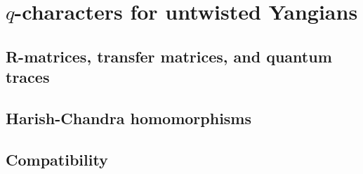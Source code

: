 \section{\texorpdfstring{$q$-characters for untwisted Yangians}{}}
    \subsection{R-matrices, transfer matrices, and quantum traces}

    \subsection{Harish-Chandra homomorphisms}

    \subsection{Compatibility}